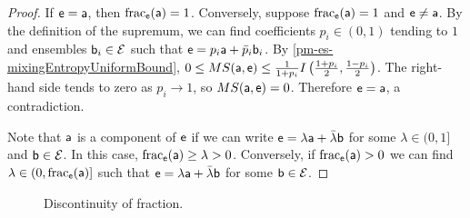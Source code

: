 \begin{mathSection}
	\begin{proof}
		If $\ens = \ens[a]$, then $\fraction_{\ens}(\ens[a]) = 1$. Conversely, suppose $\fraction_{\ens}(\ens[a]) = 1$ and $\ens \neq \ens[a]$. By the definition of the supremum, we can find coefficients $p_i \in (0,1)$ tending to $1$ and ensembles $\ens[b]_i \in \Ens$ such that $\ens = p_i \ens[a] + \bar{p}_i \ens[b]_i$. By \ref{pm-es-mixingEntropyUniformBound}, $0 \leq MS(\ens[a],\ens) \leq \frac{1}{1+p_i}I\left(\frac{1+p_i}{2},\frac{1-p_i}{2}\right)$. The right-hand side tends to zero as $p_i \to 1$, so $MS(\ens[a],\ens)=0$. Therefore $\ens=\ens[a]$, a contradiction.
		
		Note that $\ens[a]$ is a component of $\ens$ if we can write $\ens = \lambda \ens[a] + \bar{\lambda} \ens[b]$ for some $\lambda \in (0,1]$ and $\ens[b] \in \Ens$. In this case, $\fraction_{\ens}(\ens[a]) \geq \lambda > 0$. Conversely, if $\fraction_{\ens}(\ens[a]) > 0$ we can find $\lambda \in (0,\fraction_{\ens}(\ens[a])]$ such that $\ens = \lambda \ens[a] + \bar{\lambda} \ens[b]$ for some $\ens[b] \in \Ens$.
	\end{proof}

\end{mathSection}

\begin{figure}[H]
	\centering
	\caption{Discontinuity of fraction.}\label{pm-es-fig-fractionDiscontinuous}
\end{figure}

